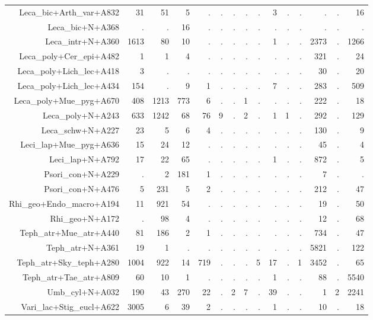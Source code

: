 \documentclass[a4paper, 11]{article}\usepackage[]{graphicx}\usepackage[]{color}
\begin{document}
\begin{table}
\begin{tabular}{rrrrrrrrrrrrrrr}
  Leca\_bic+Arth\_var+A832 & 31 & 51 & 5 & . & . & . & . & . & 3 & . & . & . & . & 16 \\ 
  Leca\_bic+N+A368 & . & . & 16 & . & . & . & . & . & . & . & . & . & . & . \\ 
  Leca\_intr+N+A360 & 1613 & 80 & 10 & . & . & . & . & . & 1 & . & . & 2373 & . & 1266 \\ 
  Leca\_poly+Cer\_epi+A482 & 1 & 1 & 4 & . & . & . & . & . & . & . & . & 321 & . & 24 \\ 
  Leca\_poly+Lich\_lec+A418 & 3 & . & . & . & . & . & . & . & . & . & . & 30 & . & 20 \\ 
  Leca\_poly+Lich\_lec+A434 & 154 & . & 9 & 1 & . & . & . & . & 7 & . & . & 283 & . & 509 \\ 
  Leca\_poly+Mue\_pyg+A670 & 408 & 1213 & 773 & 6 & . & . & 1 & . & . & . & . & 222 & . & 18 \\ 
  Leca\_poly+N+A243 & 633 & 1242 & 68 & 76 & 9 & . & 2 & . & 1 & 1 & . & 292 & . & 129 \\ 
  Leca\_schw+N+A227 & 23 & 5 & 6 & 4 & . & . & . & . & . & . & . & 130 & . & 9 \\ 
  Leci\_lap+Mue\_pyg+A636 & 15 & 24 & 12 & . & . & . & . & . & . & . & . & 45 & . & 4 \\ 
  Leci\_lap+N+A792 & 17 & 22 & 65 & . & . & . & . & . & 1 & . & . & 872 & . & 5 \\ 
  Psori\_con+N+A229 & . & 2 & 181 & 1 & . & . & . & . & . & . & . & 7 & . & . \\ 
  Psori\_con+N+A476 & 5 & 231 & 5 & 2 & . & . & . & . & . & . & . & 212 & . & 47 \\ 
  Rhi\_geo+Endo\_macro+A194 & 11 & 921 & 54 & . & . & . & . & . & . & . & . & 19 & . & 50 \\ 
  Rhi\_geo+N+A172 & . & 98 & 4 & . & . & . & . & . & . & . & . & 12 & . & 68 \\ 
  Teph\_atr+Mue\_atr+A440 & 81 & 186 & 2 & 1 & . & . & . & . & . & . & . & 734 & . & 47 \\ 
  Teph\_atr+N+A361 & 19 & 1 & . & . & . & . & . & . & . & . & . & 5821 & . & 122 \\ 
  Teph\_atr+Sky\_teph+A280 & 1004 & 922 & 14 & 719 & . & . & . & 5 & 17 & . & 1 & 3452 & . & 65 \\ 
  Teph\_atr+Tae\_atr+A809 & 60 & 10 & 1 & . & . & . & . & . & 1 & . & . & 88 & . & 5540 \\ 
  Umb\_cyl+N+A032 & 190 & 43 & 270 & 22 & . & 2 & 7 & . & 39 & . & . & 1 & 2 & 2241 \\ 
  Vari\_lac+Stig\_eucl+A622 & 3005 & 6 & 39 & 2 & . & . & . & . & 1 & . & . & 10 & . & 18 \\ 
   \hline
\end{tabular}
\end{table}
\end{document}
